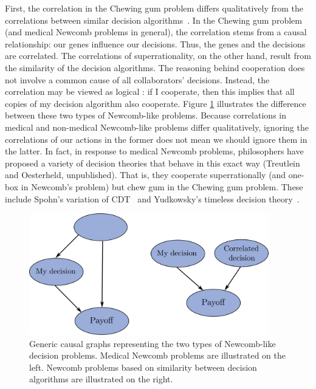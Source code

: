First, the correlation in the Chewing gum problem differs qualitatively
from the correlations between similar decision algorithms~\parencite{OesterheldTreutlein201X}.
In the Chewing gum problem (and
medical Newcomb problems in general), the correlation stems from a
causal relationship: our genes influence our decisions. Thus, the genes
and the decisions are correlated. The correlations of superrationality,
on the other hand, result from the similarity of the decision
algorithms. The reasoning behind cooperation does not involve a common
cause of all collaborators' decisions. Instead, the correlation may be
viewed as logical \parencite{Garrabrant2016-km}: if I
cooperate, then this implies that all copies of my decision algorithm
also cooperate. Figure \ref{two-types} illustrates the difference between
these two types of Newcomb-like problems. Because correlations in
medical and non-medical Newcomb-like problems differ qualitatively,
ignoring the correlations of our actions in the former does not mean we
should ignore them in the latter. In fact, in response to medical
Newcomb problems, philosophers have proposed a variety of decision
theories that behave in this exact way (Treutlein and Oesterheld,
unpublished). That is, they cooperate superrationally (and one-box in
Newcomb's problem) but chew gum in the Chewing gum problem. These
include Spohn's variation of CDT~\parencite{Spohn2003-zf,Spohn2005-tm,Spohn2012-fo} and Yudkowsky's
timeless decision theory~\parencite{Yudkowsky2010-ul}.

\begin{figure}[h!]
    \centering
    \includegraphics[width=4.1in]{figs/two-types}
    \caption{Generic causal graphs representing the two types of Newcomb-like decision problems. Medical Newcomb problems are illustrated on the left. Newcomb problems based on similarity between decision algorithms are illustrated on the right.}
    \label{two-types}
\end{figure}

